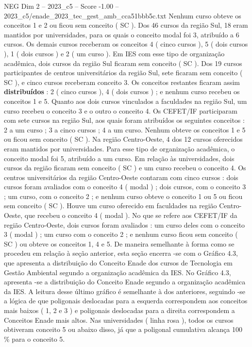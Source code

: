 \begin{textsample}{NEG Dim 2 – 2023\_c5 – Score -1.00 – 2023\_c5/enade\_2023\_tec\_gest\_amb\_cca51bbb5c.txt}
Nenhum curso obteve os conceitos 1 e 2 ou ficou sem conceito ( SC ).
Dos 46 cursos da região Sul, 18 eram mantidos por universidades, para os quais o conceito modal foi 3, atribuído a 6 cursos.
Os demais cursos receberam os conceitos 4 ( cinco cursos ), 5 ( dois cursos ), 1 ( dois cursos ) e 2 ( um curso ).
Em IES com esse tipo de organização acadêmica, dois cursos da região Sul ficaram sem conceito ( SC ).
Dos 19 cursos participantes de centros universitários da região Sul, sete ficaram sem conceito ( SC ), e cinco cursos receberam conceito 3.
Os conceitos restantes ficaram assim \textbf{distribuídos} : 2 ( cinco cursos ), 4 ( dois cursos ) ; e nenhum curso recebeu os conceitos 1 e 5.
Quanto aos dois cursos vinculados a faculdades na região Sul, um curso recebeu o conceito 3 e o outro o conceito 4.
Os CEFET/IF participaram com sete cursos na região Sul, aos quais foram atribuídos os seguintes conceitos : 2 a um curso ; 3 a cinco cursos ; 4 a um curso.
Nenhum obteve os conceitos 1 e 5 ou ficou sem conceito ( SC ).
Na região Centro-Oeste, 4 dos 12 cursos oferecidos eram mantidos por universidades.
Para esse tipo de organização acadêmica, o conceito modal foi 5, atribuído a um curso.
Em relação às universidades, dois cursos da região ficaram sem conceito ( SC ) e um curso recebeu o conceito 4.
Os centros universitários da região Centro-Oeste contaram com cinco cursos : dois cursos foram avaliados com o conceito 4 ( modal ) ; dois cursos, com o conceito 3 ; um curso, com o conceito 2 ; e nenhum curso obteve o conceito 1 ou 5 ou ficou sem conceito ( SC ).
Houve um curso oferecido em faculdades na região Centro-Oeste, que recebeu o conceito 4 ( modal ).
No que se refere aos CEFET/IF da região Centro-Oeste, dois cursos foram avaliados : um curso deles com o conceito 3 ( modal ) ; um curso com o conceito 2 ; e nenhum curso ficou sem conceito ( SC ) ou obteve os conceitos 1, 4 e 5.
De maneira semelhante à forma como se procedeu em relação à seção anterior, esta seção encerra -se com o Gráfico 4.3, que apresenta a distribuição do Conceito Enade dos cursos de Tecnologia em Gestão Ambiental segundo a organização acadêmica da IES.
No Gráfico 4.3, apresenta -se a distribuição do Conceito Enade segundo a organização acadêmica da IES.
A leitura desse último gráfico é semelhante à dos anteriores, seguindo -se a lógica de que poligonais deslocadas para a esquerda correspondem aos conceitos mais baixos ( 1, 2 e 3 ) e poligonais deslocadas para a direita correspondem a Conceitos Enade mais altos.
Nas universidades ( linha rosa ), todos os cursos obtiveram conceito 5 ou abaixo disso, já que a poligonal cumulativa alcança 100 \% para o conceito 5.

\end{textsample}
